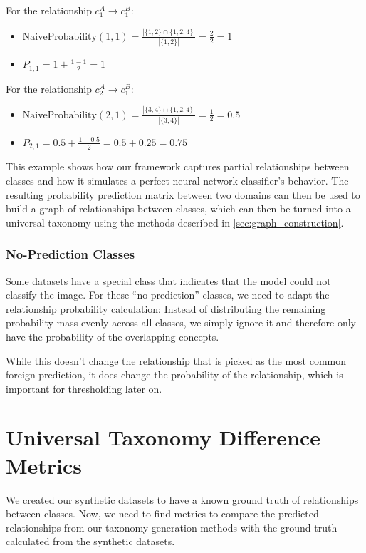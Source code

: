 For the relationship $c^A_1 \rightarrow c^B_1$:
\begin{itemize}
    \item $\text{NaiveProbability}(1,1) = \frac{|\{1,2\} \cap \{1,2,4\}|}{|\{1,2\}|} = \frac{2}{2} = 1$
    \item $P_{1,1} = 1 + \frac{1-1}{2} = 1$
\end{itemize}

For the relationship $c^A_2 \rightarrow c^B_1$:
\begin{itemize}
    \item $\text{NaiveProbability}(2,1) = \frac{|\{3,4\} \cap \{1,2,4\}|}{|\{3,4\}|} = \frac{1}{2} = 0.5$
    \item $P_{2,1} = 0.5 + \frac{1-0.5}{2} = 0.5 + 0.25 = 0.75$
\end{itemize}

This example shows how our framework captures partial relationships between classes
and how it simulates a perfect neural network classifier's behavior.
The resulting probability prediction matrix between two domains can then be used
to build a graph of relationships between classes,
which can then be turned into a universal taxonomy using the methods described in \autoref{sec:graph_construction}.

\subsubsection{No-Prediction Classes}

Some datasets have a special class that indicates that the model could not classify the image.
For these \enquote{no-prediction} classes, we need to adapt the relationship probability calculation:
Instead of distributing the remaining probability mass evenly across all classes,
we simply ignore it and therefore only have the probability of the overlapping concepts.

While this doesn't change the relationship that is picked as the most common foreign prediction,
it does change the probability of the relationship, which is important for thresholding later on.

\section{Universal Taxonomy Difference Metrics}

We created our synthetic datasets to have a known ground truth of relationships between classes.
Now, we need to find metrics to compare the predicted relationships
from our taxonomy generation methods
with the ground truth calculated from the synthetic datasets.

